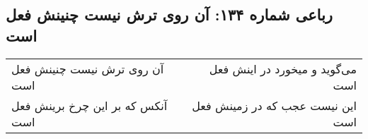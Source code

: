 \begin{center}
\section*{رباعی شماره ۱۳۴: آن روی ترش نیست چنینش فعل است}
\label{sec:0134}
\begin{longtable}{l p{0.5cm} r}
آن روی ترش نیست چنینش فعل است
&&
می‌گوید و میخورد در اینش فعل است
\\
آنکس که بر این چرخ برینش فعل است
&&
این نیست عجب که در زمینش فعل است
\\
\end{longtable}
\end{center}

